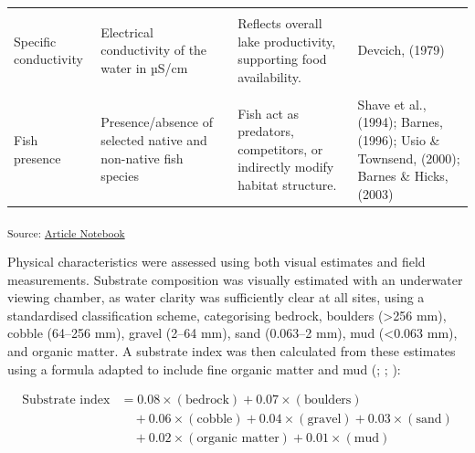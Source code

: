 \documentclass[
  letterpaper,
  DIV=11,
  numbers=noendperiod]{scrartcl}
\begin{document}
\begin{landscape}
\begin{longtable}[t]{>{\raggedright\arraybackslash}p{2.5cm}>{\raggedright\arraybackslash}p{3.5cm}>{\raggedright\arraybackslash}p{9.5cm}>{\raggedright\arraybackslash}p{5.0cm}}
\cellcolor{gray!8}{Dissolved oxygen} & \cellcolor{gray!8}{Dissolved oxygen concentration in mg/L} & \cellcolor{gray!8}{Essential for respiration; reduced oxygen may constrain activity and habitat use.} & \cellcolor{gray!8}{Hammond et al., (2006); Broughton et al., (2017)}\\
Specific conductivity & Electrical conductivity of the water in µS/cm & Reflects overall lake productivity, supporting food availability. & Devcich, (1979)\\
\addlinespace
\cellcolor{gray!8}{pH} & \cellcolor{gray!8}{Acidity or alkalinity of the water} & \cellcolor{gray!8}{Influences moulting success and exoskeleton strength, affected by acidity or calcium levels.} & \cellcolor{gray!8}{Olsson et al., (2006)}\\
Fish presence & Presence/absence of selected native and non-native fish species & Fish act as predators, competitors, or indirectly modify habitat structure. & Shave et al., (1994); Barnes, (1996); Usio \& Townsend, (2000); Barnes \& Hicks, (2003)\\
\bottomrule

\end{longtable}

\endgroup{}
\end{landscape}

\textsubscript{Source:
\href{https://OlivierRaven.github.io/Koura_shoreline_habitats/index.qmd.html}{Article
Notebook}}

Physical characteristics were assessed using both visual estimates and
field measurements. Substrate composition was visually estimated with an
underwater viewing chamber, as water clarity was sufficiently clear at
all sites, using a standardised classification scheme, categorising
bedrock, boulders (\textgreater256 mm), cobble (64--256 mm), gravel
(2--64 mm), sand (0.063--2 mm), mud (\textless0.063 mm), and organic
matter. A substrate index was then calculated from these estimates using
a formula adapted to include fine organic matter and mud
(;
;
):

\[
\begin{aligned}
\text{Substrate index} &= 0.08 \times (\text{bedrock}) + 0.07 \times (\text{boulders}) \\
&\quad + 0.06 \times (\text{cobble}) + 0.04 \times (\text{gravel}) + 0.03 \times (\text{sand}) \\
&\quad + 0.02 \times (\text{organic matter}) + 0.01 \times (\text{mud})
\end{aligned}
\]
\end{document}
